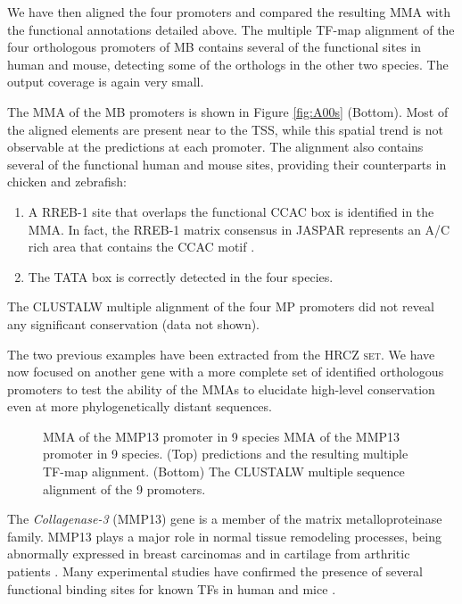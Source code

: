 We have then aligned the four promoters and compared the resulting MMA with the
functional annotations detailed above. The multiple TF-map
alignment of the four orthologous promoters of MB contains several of the
functional sites in human and mouse, detecting some of the
orthologs in the other two species. The output coverage is again very small.

The MMA of the MB promoters is shown in Figure \ref{fig:A00s} (Bottom). Most of the aligned
elements are present near to the TSS, while this spatial trend is not observable 
at the predictions at each promoter. The alignment also contains several
of the functional human and mouse sites, providing their counterparts in 
chicken and zebrafish:

\begin{enumerate}
\item
A RREB-1 site that overlaps the functional CCAC box is identified in the MMA.
In fact, the RREB-1 matrix consensus in JASPAR represents an A/C rich area that  
contains the CCAC motif \citep{vlieghe:2006a}.
\item
The TATA box is correctly detected in the four species.
\end{enumerate}

The CLUSTALW multiple alignment of the four MP promoters did not reveal any 
significant conservation (data not shown).



The two previous examples have been extracted from the \textsc{HRCZ set}. 
We have now focused on another gene with a more complete set of identified
orthologous promoters to test the ability of the MMAs to elucidate high-level
conservation even at more phylogenetically distant sequences.

\begin{figure}[t!]
\begin{center}
\setlength{\fboxsep}{0pt}
          {MMA of the MMP13 promoter in 9 species}%
          {MMA of the MMP13 promoter in 9 species.}%
          {(Top)  predictions and the resulting multiple TF-map alignment.
           (Bottom) The CLUSTALW multiple sequence alignment of the 9 promoters.}
\end{center}
\end{figure}

The \emph{Collagenase-3} (MMP13) gene is a member of the matrix metalloproteinase
family. MMP13 plays a major role in normal tissue remodeling processes, being
abnormally expressed in breast carcinomas and in cartilage from arthritic 
patients \citep{pendas:1997a}. Many experimental studies have  
confirmed the presence of several functional binding sites for known TFs
in human and mice 
\citep{pendas:1997a,benbow:1997a,jimenez:1999a,sun:2000a,hess:2001a,benderdour:2002a,wu:2002a}.

